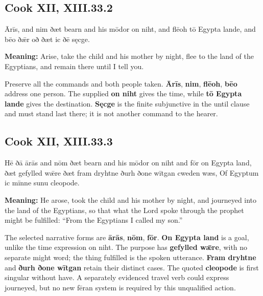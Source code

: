 \par\begin{minipage}{\linewidth}\raggedright
\subsection*{Cook XII, XIII.33.2}

Ārīs, and nim ðæt bearn and his mōdor on niht, and flēoh tō Egypta lande, and bēo ðǣr oð ðæt ic ðē sęcge.

\textbf{Meaning:} Arise, take the child and his mother by night, flee to the land of the Egyptians, and remain there until I tell you.

Preserve all the commands and both people taken. \textbf{Ārīs}, \textbf{nim}, \textbf{flēoh}, \textbf{bēo} address one person. The supplied \textbf{on niht} gives the time, while \textbf{tō Egypta lande} gives the destination. \textbf{Sęcge} is the finite subjunctive in the until clause and must stand last there; it is not another command to the hearer.

\end{minipage}\par\addvspace{4pt}

\par\begin{minipage}{\linewidth}\raggedright
\subsection*{Cook XII, XIII.33.3}

Hē ðā ārās and nōm ðæt bearn and his mōdor on niht and fōr on Egypta land, ðæt gefylled wǣre ðæt fram dryhtne ðurh ðone wītgan cweden wæs, Of Egyptum ic mīnne sunu cleopode.

\textbf{Meaning:} He arose, took the child and his mother by night, and journeyed into the land of the Egyptians, so that what the Lord spoke through the prophet might be fulfilled: “From the Egyptians I called my son.”

The selected narrative forms are \textbf{ārās}, \textbf{nōm}, \textbf{fōr}. \textbf{On Egypta land} is a goal, unlike the time expression on niht. The purpose has \textbf{gefylled wǣre}, with no separate might word; the thing fulfilled is the spoken utterance. \textbf{Fram dryhtne} and \textbf{ðurh ðone wītgan} retain their distinct cases. The quoted \textbf{cleopode} is first singular without have. A separately evidenced travel verb could express journeyed, but no new fēran system is required by this unqualified action.

\end{minipage}\par\addvspace{4pt}

